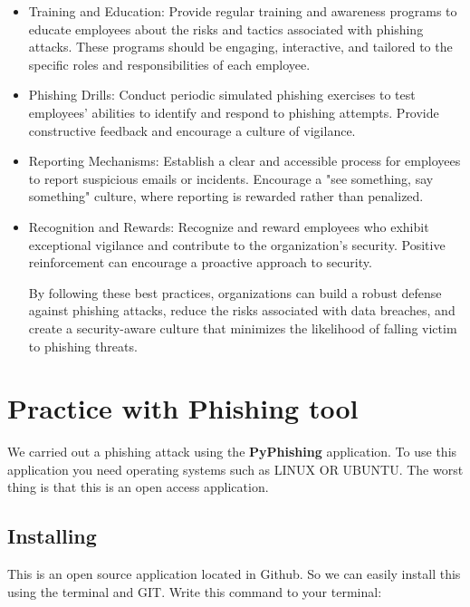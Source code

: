 \documentclass[conference]{IEEEtran}
\begin{document}
\begin{itemize}

\item Training and Education: Provide regular training and awareness programs to educate employees about the risks and tactics associated with phishing attacks. These programs should be engaging, interactive, and tailored to the specific roles and responsibilities of each employee.

\item  Phishing Drills: Conduct periodic simulated phishing exercises to test employees' abilities to identify and respond to phishing attempts. Provide constructive feedback and encourage a culture of vigilance.

\item  Reporting Mechanisms: Establish a clear and accessible process for employees to report suspicious emails or incidents. Encourage a "see something, say something" culture, where reporting is rewarded rather than penalized.

\item Recognition and Rewards: Recognize and reward employees who exhibit exceptional vigilance and contribute to the organization's security. Positive reinforcement can encourage a proactive approach to security.

By following these best practices, organizations can build a robust defense against phishing attacks, reduce the risks associated with data breaches, and create a security-aware culture that minimizes the likelihood of falling victim to phishing threats.

\end{itemize}


\section{ Practice with Phishing tool}

We carried out a phishing attack using the \textbf{PyPhishing} application. To use this application you need operating systems such as LINUX OR UBUNTU. The worst thing is that this is an open access application. 

\subsection{Installing}
This is an open source application located in Github. So we can easily install this using the terminal and GIT. 
Write this command to your terminal: 
\end{document}
